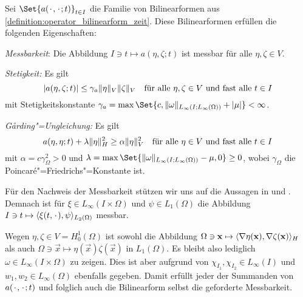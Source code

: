 \documentclass[../main.tex]{subfiles}
\begin{document}
\begin{Satz}
\label{satz:bilinearform_messbar_stetig_garding}
    Sei $\Set{a(\blank, \blank; t)}_{t \in I}$ die Familie von Bilinearformen aus \cref{definition:operator_bilinearform_zeit}.
    Diese Bilinearformen erfüllen die folgenden Eigenschaften:
    \begin{thmenumerate}
        \item\label{satz:bilinearform_messbar_stetig_garding:messbar}
        \emph{Messbarkeit}: Die Abbildung $I \ni t \mapsto a(\eta, \zeta; t)$ ist messbar für alle $\eta, \zeta \in V$.
        \item\label{satz:bilinearform_messbar_stetig_garding:stetig}
        \emph{Stetigkeit:} Es gilt
        \begin{equation}
            \label{eq:bilinearform_messbar_stetig_garding:stetig}
            \abs{a(\eta, \zeta; t)} \leq \gamma_{a} \norm{\eta}_{V} \norm{\zeta}_{V} \quad \fa \eta, \zeta \in V \text{ und fast alle } t \in I
        \end{equation}
        mit Stetigkeitskonstante $\gamma_{a} = \max\Set{c, \norm{\omega}_{L_{\infty}(I; L_{\infty}(\Omega))} + \abs{\mu}} < \infty$.
        \item\label{satz:bilinearform_messbar_stetig_garding:garding}
        \emph{G\aa{}rding"=Ungleichung:} Es gilt
        \begin{equation}
            \label{eq:bilinearform_messbar_stetig_garding:garding}
            a(\eta, \eta; t) + \lambda \norm{\eta}_{H}^{2} \geq \alpha \norm{\eta}_{V}^{2} \quad \fa \eta \in V \text{ und fast alle } t \in I
        \end{equation}
        mit $\alpha = c \gamma_{\Omega}^{2} > 0$ und $\lambda = \max\Set{\norm{\omega}_{L_{\infty}(I; L_{\infty}(\Omega))} - \mu, 0} \geq 0$, wobei $\gamma_{\Omega}$ die Poincaré"=Friedrichs"=Konstante ist.
    \end{thmenumerate}

    \begin{Beweis}
        Für den Nachweis der Messbarkeit stützen wir uns auf die Aussagen in \cite[177]{fattorini2005infinite} und \cite[Theorem 2.7.9, Corollary 2.7.10, Lemma 8.1.1]{Andreev:2012ep}.
        Demnach ist für $\xi \in L_{\infty}(I \times \Omega)$ und $\psi \in L_{1}(\Omega)$ die Abbildung $I \ni t \mapsto \langle\xi(t, {\mkern2mu\cdot\mkern2mu}),\psi\rangle_{L_{2}(\Omega)}$ messbar.

        Wegen $\eta, \zeta \in V = H^{1}_{0}(\Omega)$ ist sowohl die Abbildung $\Omega \ni \mathbf{x} \mapsto \langle\nabla \eta(\mathbf{x}),\nabla \zeta (\mathbf{x})\rangle_{H}$ als auch $\Omega \ni \vec x \mapsto \eta(\vec{x})\zeta (\vec x)$ in $L_{1}(\Omega)$.
        Es bleibt also lediglich $\omega \in L_{\infty}(I \times \Omega)$ zu zeigen.
        Dies ist aber aufgrund von $\chi_{I_{1}}, \chi_{I_{2}} \in L_{\infty}(I)$ und $w_{1}, w_{2} \in L_{\infty}(\Omega)$ ebenfalls gegeben.
        Damit erfüllt jeder der Summanden von $a({\mkern2mu\cdot\mkern2mu}, {\mkern2mu\cdot\mkern2mu}; t)$ und folglich auch die Bilinearform selbst die geforderte Messbarkeit.


\end{Beweis}
\end{Satz}
\end{document}
